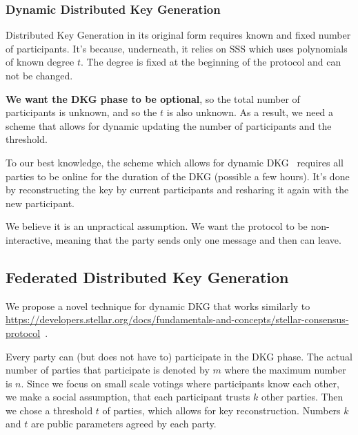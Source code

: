 \documentclass{article}
\begin{document}
\subsubsection{Dynamic Distributed Key Generation}
Distributed Key Generation in its original form requires known and fixed number of participants. It's because, underneath, it relies on SSS which uses polynomials of known degree $t$. The degree is fixed at the beginning of the protocol and can not be changed.

\textbf{We want the DKG phase to be optional}, so the total number of participants is unknown, and so the $t$ is also unknown. As a result, we need a scheme that allows for dynamic updating the number of participants and the threshold.

To our best knowledge, the scheme which allows for dynamic DKG~\cite{delerableeDynamicThresholdPublickey2008} requires all parties to be online for the duration of the DKG (possible a few hours). It's done by reconstructing the key by current participants and resharing it again with the new participant.

We believe it is an unpractical assumption. We want the protocol to be non-interactive, meaning that the party sends only one message and then can leave.



\subsection{Federated Distributed Key Generation}

We propose a novel technique for dynamic DKG that works similarly to \href{Stellar Consensus Protocol}{https://developers.stellar.org/docs/fundamentals-and-concepts/stellar-consensus-protocol}~\cite{mazieresStellarConsensusProtocol2015}.

Every party can (but does not have to) participate in the DKG phase. The actual number of parties that participate is denoted by $m$ where the maximum number is $n$. Since we focus on small scale votings where participants know each other, we make a social assumption, that each participant trusts $k$ other parties. Then we chose a threshold $t$ of parties, which allows for key reconstruction. Numbers $k$ and $t$ are public parameters agreed by each party.
\end{document}
